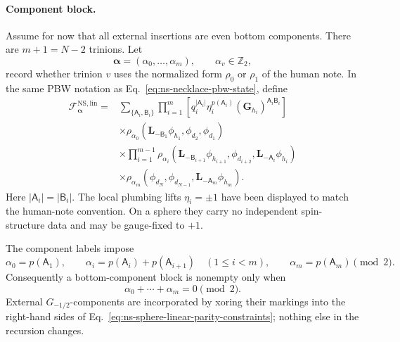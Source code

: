 \documentclass[11pt]{article}
\newcommand{\NS}{\mathrm{NS}}
\newcommand{\F}{\mathcal F}
\begin{document}
\paragraph{Component block.}
Assume for now that all external insertions are even bottom components.
There are \(m+1=N-2\) trinions.  Let
\begin{equation}
 \boldsymbol\alpha=(\alpha_0,\ldots,\alpha_m),
 \qquad \alpha_v\in\mathbb Z_2,
 \label{eq:ns-sphere-vertex-sectors}
\end{equation}
record whether trinion \(v\) uses the normalized form \(\rho_0\) or
\(\rho_1\) of the human note.  In the same PBW notation as
Eq.~\eqref{eq:ns-necklace-pbw-state}, define
\begin{equation}
 \begin{split}
 \F^{\NS,\mathrm{lin}}_{\boldsymbol\alpha}
 ={}&
 \sum_{\{\mathsf A_i,\mathsf B_i\}}
 \prod_{i=1}^{m}
 \left[
 q_i^{|\mathsf A_i|}
 \eta_i^{p(\mathsf A_i)}
 (\mathbf G_{h_i})^{\mathsf A_i\mathsf B_i}
 \right]
 \\
 &\times
 \rho_{\alpha_0}\!\left(
 \mathbf L_{-\mathsf B_1}\phi_{h_1},
 \phi_{d_2},\phi_{d_1}\right)
 \\
 &\times
 \prod_{i=1}^{m-1}
 \rho_{\alpha_i}\!\left(
 \mathbf L_{-\mathsf B_{i+1}}\phi_{h_{i+1}},
 \phi_{d_{i+2}},
 \mathbf L_{-\mathsf A_i}\phi_{h_i}\right)
 \\
 &\times
 \rho_{\alpha_m}\!\left(
 \phi_{d_N},\phi_{d_{N-1}},
 \mathbf L_{-\mathsf A_m}\phi_{h_m}\right).
 \end{split}
 \label{eq:ns-sphere-linear-block-definition}
\end{equation}
Here \(|\mathsf A_i|=|\mathsf B_i|\).  The local plumbing lifts
\(\eta_i=\pm1\) have been displayed to match the human-note convention.
On a sphere they carry no independent spin-structure data and may be
gauge-fixed to \(+1\).

The component labels impose
\begin{equation}
 \alpha_0=p(\mathsf A_1),\qquad
 \alpha_i=p(\mathsf A_i)+p(\mathsf A_{i+1})
 \quad(1\leq i<m),\qquad
 \alpha_m=p(\mathsf A_m)
 \pmod2.
 \label{eq:ns-sphere-linear-parity-constraints}
\end{equation}
Consequently a bottom-component block is nonempty only when
\begin{equation}
 \alpha_0+\cdots+\alpha_m=0\pmod2.
 \label{eq:ns-sphere-linear-sector-constraint}
\end{equation}
External \(G_{-1/2}\)-components are incorporated by xoring their markings
into the right-hand sides of
Eq.~\eqref{eq:ns-sphere-linear-parity-constraints}; nothing else in the
recursion changes.
\end{document}

